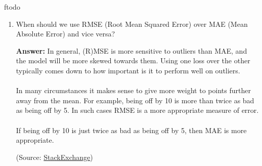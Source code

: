 ƒtodo\documentclass{article}
\newenvironment{QandA}{\begin{enumerate}[label=\arabic*.]}{\end{enumerate}}
\newenvironment{answer}{\par\normalfont \textbf{Answer:}}{}
\begin{document}
\begin{QandA}
    \item When should we use RMSE (Root Mean Squared Error) over MAE (Mean Absolute Error) and vice versa?
    \begin{answer}
        In general, (R)MSE is more sensitive to outliers than MAE, and the model will be more skewed towards them. Using one loss over the other typically comes down to how important is it to perform well on outliers.\\\\
         In many circumstances it makes sense to give more weight to points further away from the mean. For example, being off by 10 is more than twice as bad as being off by 5. In such cases RMSE is a more appropriate measure of error. \\\\
         If being off by 10 is just twice as bad as being off by 5, then MAE is more appropriate.

         (Source: \href{https://stats.stackexchange.com/questions/48267/mean-absolute-error-or-root-mean-squared-error}{StackExchange})
    \end{answer}


\end{QandA}
\end{document}
